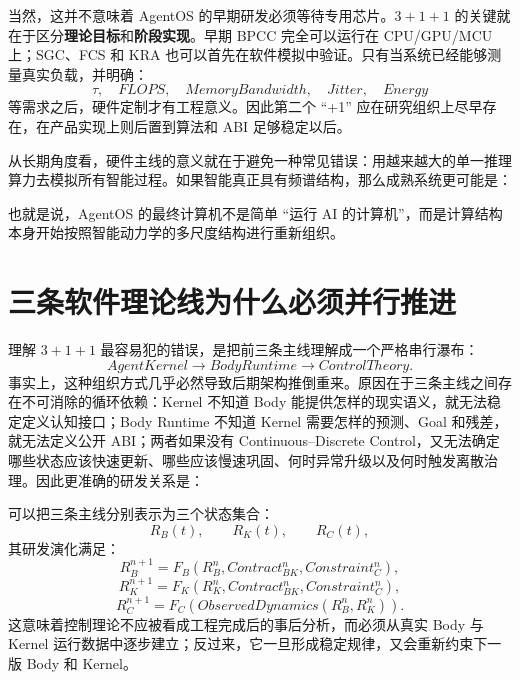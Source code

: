当然，这并不意味着 AgentOS 的早期研发必须等待专用芯片。$3+1+1$ 的关键就在于区分\textbf{理论目标}和\textbf{阶段实现}。早期 BPCC 完全可以运行在 CPU/GPU/MCU 上；SGC、FCS 和 KRA 也可以首先在软件模拟中验证。只有当系统已经能够测量真实负载，并明确：
\[
\tau,\quad FLOPS,\quad MemoryBandwidth,\quad Jitter,\quad Energy
\]
等需求之后，硬件定制才有工程意义。因此第二个 ``+1'' 应在研究组织上尽早存在，在产品实现上则后置到算法和 ABI 足够稳定以后。

从长期角度看，硬件主线的意义就在于避免一种常见错误：用越来越大的单一推理算力去模拟所有智能过程。如果智能真正具有频谱结构，那么成熟系统更可能是：
\begin{statementbox}
\centering
{}
\end{statementbox}
也就是说，AgentOS 的最终计算机不是简单 ``运行 AI 的计算机''，而是计算结构本身开始按照智能动力学的多尺度结构进行重新组织。

\section{三条软件理论线为什么必须并行推进}
\label{sec:roadmap-three-lines-parallel}

理解 $3+1+1$ 最容易犯的错误，是把前三条主线理解成一个严格串行瀑布：
\[
AgentKernel
\rightarrow
BodyRuntime
\rightarrow
ControlTheory.
\]
事实上，这种组织方式几乎必然导致后期架构推倒重来。原因在于三条主线之间存在不可消除的循环依赖：Kernel 不知道 Body 能提供怎样的现实语义，就无法稳定定义认知接口；Body Runtime 不知道 Kernel 需要怎样的预测、Goal 和残差，就无法定义公开 ABI；两者如果没有 Continuous--Discrete Control，又无法确定哪些状态应该快速更新、哪些应该慢速巩固、何时异常升级以及何时触发离散治理。因此更准确的研发关系是：
\begin{statementbox}
\centering
{}
\end{statementbox}

可以把三条主线分别表示为三个状态集合：
\[
R_B(t),\qquad
R_K(t),\qquad
R_C(t),
\]
其研发演化满足：
\[
R_B^{n+1}
=
F_B
\left(
R_B^n,
Contract_{BK}^n,
Constraint_C^n
\right),
\]
\[
R_K^{n+1}
=
F_K
\left(
R_K^n,
Contract_{BK}^n,
Constraint_C^n
\right),
\]
\[
R_C^{n+1}
=
F_C
\left(
ObservedDynamics(R_B^n,R_K^n)
\right).
\]
这意味着控制理论不应被看成工程完成后的事后分析，而必须从真实 Body 与 Kernel 运行数据中逐步建立；反过来，它一旦形成稳定规律，又会重新约束下一版 Body 和 Kernel。


